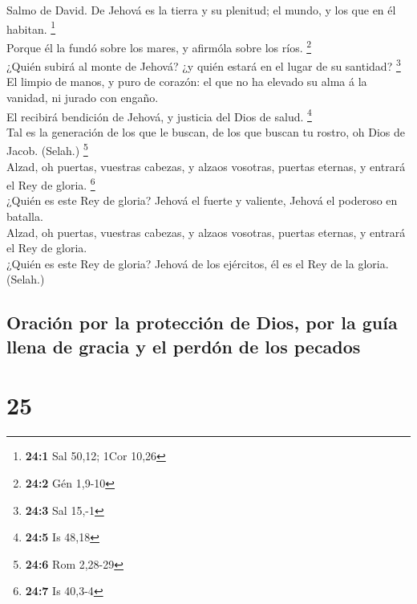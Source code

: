  Salmo de David. De Jehová es la tierra y su plenitud; el
mundo, y los que en él habitan. \footnote{\textbf{24:1} Sal 50,12; 1Cor
  10,26}\\
 Porque él la fundó sobre los mares, y afirmóla sobre los
ríos. \footnote{\textbf{24:2} Gén 1,9-10}\\
 ¿Quién subirá al monte de Jehová? ¿y quién estará en el
lugar de su santidad? \footnote{\textbf{24:3} Sal 15,-1}\\
 El limpio de manos, y puro de corazón: el que no ha
elevado su alma á la vanidad, ni jurado con engaño.\\
 El recibirá bendición de Jehová, y justicia del Dios de
salud. \footnote{\textbf{24:5} Is 48,18}\\
 Tal es la generación de los que le buscan, de los que
buscan tu rostro, oh Dios de Jacob. (Selah.) \footnote{\textbf{24:6} Rom
  2,28-29}\\
 Alzad, oh puertas, vuestras cabezas, y alzaos vosotras,
puertas eternas, y entrará el Rey de gloria. \footnote{\textbf{24:7} Is
  40,3-4}\\
 ¿Quién es este Rey de gloria? Jehová el fuerte y
valiente, Jehová el poderoso en batalla.\\
 Alzad, oh puertas, vuestras cabezas, y alzaos vosotras,
puertas eternas, y entrará el Rey de gloria.\\
 ¿Quién es este Rey de gloria? Jehová de los ejércitos,
él es el Rey de la gloria. (Selah.)

\hypertarget{oraciuxf3n-por-la-protecciuxf3n-de-dios-por-la-guuxeda-llena-de-gracia-y-el-perduxf3n-de-los-pecados}{%
\subsection{Oración por la protección de Dios, por la guía llena de
gracia y el perdón de los
pecados}\label{oraciuxf3n-por-la-protecciuxf3n-de-dios-por-la-guuxeda-llena-de-gracia-y-el-perduxf3n-de-los-pecados}}

\hypertarget{section-24}{%
\section{25}\label{section-24}}

